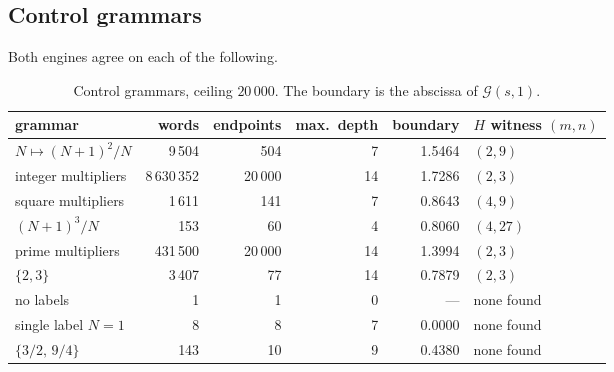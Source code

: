 \documentclass[11pt,a4paper]{article}
\begin{document}
\subsection{Control grammars}
Both engines agree on each of the following.
\begin{table}[htbp]\centering\small
\begin{tabular}{lrrrrl}\toprule
grammar & words & endpoints & max.\ depth & boundary & $H$ witness $(m,n)$\\\midrule
$N\mapsto (N+1)^2/N$ & 9\,504 & 504 & 7 & 1.5464 & $(2,9)$\\
integer multipliers & 8\,630\,352 & 20\,000 & 14 & 1.7286 & $(2,3)$\\
square multipliers & 1\,611 & 141 & 7 & 0.8643 & $(4,9)$\\
$(N+1)^3/N$ & 153 & 60 & 4 & 0.8060 & $(4,27)$\\
prime multipliers & 431\,500 & 20\,000 & 14 & 1.3994 & $(2,3)$\\
$\{2,3\}$ & 3\,407 & 77 & 14 & 0.7879 & $(2,3)$\\
no labels & 1 & 1 & 0 & --- & none found\\
single label $N=1$ & 8 & 8 & 7 & 0.0000 & none found\\
$\{3/2,\,9/4\}$ & 143 & 10 & 9 & 0.4380 & none found\\\bottomrule
\end{tabular}
\caption{Control grammars, ceiling $20\,000$. The boundary is the abscissa of $\mathcal G(s,1)$.}\label{tab:controls}
\end{table}
\end{document}
